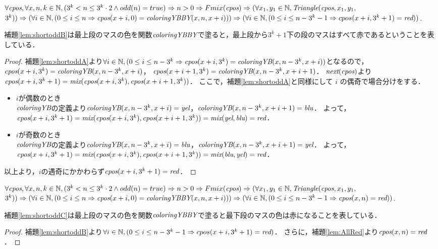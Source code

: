 \begin{lem}[\ShortOddB] \label{lem:shortoddB}
  $\forall \textit{cpos}, \forall x, n, k \in \mathbb{N},
  (3^k < n \leq 3^k \cdot 2 \land odd(n) = true) \Rightarrow
  n > 0  \Rightarrow Fmix(\textit{cpos}) \Rightarrow 
  (\forall x_1, y_1 \in \mathbb{N}, \textit{Triangle}(\textit{cpos},x_1,y_1,$ $3^k)) \Rightarrow
  (\forall i \in \mathbb{N}, (0 \leq i \leq n \Rightarrow \textit{cpos}(x+i,0) = \textit{coloringYBBY}(x,n,x+i))) \Rightarrow
  (\forall i \in \mathbb{N}, (0 \leq i \leq n - 3^k-1 \Rightarrow cpos(x+i,3^k+1)= \textit{red}))$.
\end{lem}
補題\ref{lem:shortoddB}は最上段のマスの色を関数$\textit{coloringYBBY}$で塗ると，最上段から$3^k+1$下の段のマスはすべて赤であるということを表している．
\begin{proof}
  補題\ref{lem:shortoddA}より$\forall i \in \mathbb{N}, (0 \leq i \leq n - 3^k \Rightarrow \textit{cpos}(x+i,3^k) = \textit{coloringYB}(x,n-3^k,x+i))$となるので，
  $\textit{cpos}(x+i,3^k) = \textit{coloringYB}(x,n-3^k,x+i)$，
  $\textit{cpos}(x+i+1,3^k) = \textit{coloringYB}(x,n-3^k,x+i+1)$．
  $\textit{next}(\textit{cpos})$より$\textit{cpos}(x+i,3^k+1) = \textit{mix}(\textit{cpos}(x+i,3^k),\textit{cpos}(x+i+1,3^k))$．
  ここで，補題\ref{lem:shortoddA}と同様にして $i$ の偶奇で場合分けをする．
  \begin{itemize}
  \item
    $i$が偶数のとき \\
    $\textit{coloringYB}$の定義より$\textit{coloringYB}(x,n-3^k,x+i)=\textit{yel}$，$\textit{coloringYB}(x,n-3^k,x+i+1)=\textit{blu}$．
    よって，$\textit{cpos}(x+i,3^k+1)=\textit{mix}(\textit{cpos}(x+i,3^k),\textit{cpos}(x+i+1,3^k))=\textit{mix}(\textit{yel},\textit{blu})=\textit{red}$．
  \item
    $i$が奇数のとき \\
    $\textit{coloringYB}$の定義より$\textit{coloringYB}(x,n-3^k,x+i)=\textit{blu}$，$\textit{coloringYB}(x,n-3^k,x+i+1)=\textit{yel}$．
    よって，$\textit{cpos}(x+i,3^k+1)=\textit{mix}(\textit{cpos}(x+i,3^k),\textit{cpos}(x+i+1,3^k))=\textit{mix}(\textit{blu},\textit{yel})=\textit{red}$．
  \end{itemize}
  以上より，$i$の遇奇にかかわらず$\textit{cpos}(x+i,3^k+1) = \textit{red}$．
\end{proof}

\begin{lem}[\ShortOddC] \label{lem:shortoddC}
  $\forall \textit{cpos}, \forall x, n, k \in \mathbb{N},
  (3^k < n \leq 3^k \cdot 2 \land odd(n) = true) \Rightarrow
  n > 0  \Rightarrow Fmix(\textit{cpos}) \Rightarrow 
  (\forall x_1, y_1 \in \mathbb{N}, \textit{Triangle}(\textit{cpos},x_1,y_1,$ $3^k)) \Rightarrow
  (\forall i \in \mathbb{N}, (0 \leq i \leq n \Rightarrow \textit{cpos}(x+i,0) = \textit{coloringYBBY}(x,n,x+i))) \Rightarrow
  (\forall i \in \mathbb{N}, (0 \leq i \leq n - 3^k-1 \Rightarrow \textit{cpos}(x,n)= \textit{red}))$.
\end{lem}
補題\ref{lem:shortoddC}は最上段のマスの色を関数$\textit{coloringYBBY}$で塗ると最下段のマスの色は赤になることを表している．
\begin{proof}
  補題\ref{lem:shortoddB}より$\forall i \in \mathbb{N}, (0 \leq i \leq n - 3^k-1 \Rightarrow cpos(x+i,3^k+1)= \textit{red})$．
  さらに，補題\ref{lem:AllRed}より$\textit{cpos}(x,n)=\textit{red}$．
\end{proof}

